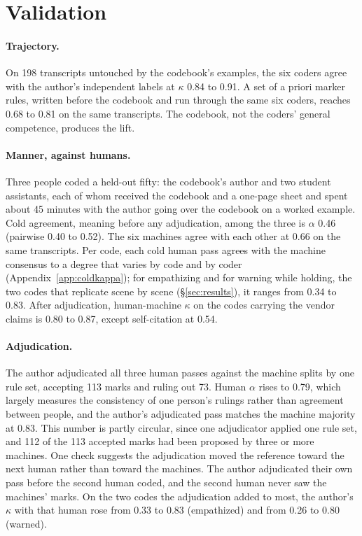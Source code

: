 \section{Validation}
\label{sec:validation}

\paragraph{Trajectory.} On 198 transcripts untouched by the codebook's examples, the six coders
agree with the author's independent labels at $\kappa$ 0.84 to 0.91. A set of a priori marker
rules, written before the codebook and run through the same six coders, reaches 0.68 to 0.81 on the
same transcripts. The codebook, not the coders' general competence, produces the lift.

\paragraph{Manner, against humans.} Three people coded a held-out fifty: the codebook's author and
two student assistants, each of whom received the codebook and a one-page sheet and spent about 45
minutes with the author going over the codebook on a worked example. Cold agreement, meaning before
any adjudication, among the three is $\alpha$ 0.46 (pairwise 0.40 to 0.52). The six machines agree with each other at
0.66 on the same transcripts. Per code, each cold human pass agrees with the machine consensus to
a degree that varies by code and by coder (Appendix~\ref{app:coldkappa}); for empathizing and for
warning while holding, the two codes that replicate scene by scene (\S\ref{sec:results}), it ranges
from 0.34 to 0.83. After adjudication, human-machine $\kappa$ on the codes carrying the vendor
claims is 0.80 to 0.87, except self-citation at 0.54.

\paragraph{Adjudication.} The author adjudicated all three human passes against the machine splits
by one rule set, accepting 113 marks and ruling out 73. Human $\alpha$ rises to 0.79, which largely
measures the consistency of one person's rulings rather than agreement between people, and the author's
adjudicated pass matches the machine majority at 0.83. This number is partly circular, since one
adjudicator applied one rule set, and 112 of the 113 accepted marks had been proposed by three or
more machines. One check suggests the adjudication moved the reference toward the next human rather
than toward the machines. The author adjudicated their own pass before the second human coded, and
the second human never saw the machines' marks. On the two codes the
adjudication added to most, the author's $\kappa$ with that human rose from 0.33 to 0.83
(empathized) and from 0.26 to 0.80 (warned).

